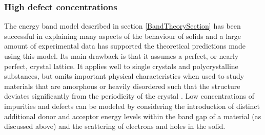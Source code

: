 \documentclass[11pt, twoside]{report}
\begin{document}
\subsubsection{High defect concentrations}
The energy band model described in section \ref{BandTheorySection} has been successful in explaining many aspects of the behaviour of solids and a large amount of experimental data has supported the theoretical predictions made using this model. Its main drawback is that it assumes a perfect, or nearly perfect, crystal lattice. It applies well to single crystals and polycrystalline substances, but omits important physical characteristics when used to study materials that are amorphous or heavily disordered such that the structure deviates significantly from the periodicity of the crystal \cite{small_semiconductor1}.
Low concentrations of impurities and defects can be modeled by considering the introduction of distinct additional donor and acceptor energy levels within the band gap of a material (as discussed above) and the scattering of electrons and holes in the solid. 
\end{document}
